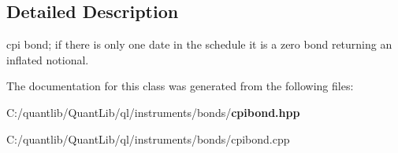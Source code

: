 \subsection{Detailed Description}
cpi bond; if there is only one date in the schedule it is a zero bond returning an inflated notional. 

The documentation for this class was generated from the following files\+:\begin{DoxyCompactItemize}
\item 
C\+:/quantlib/\+Quant\+Lib/ql/instruments/bonds/{\bf cpibond.\+hpp}\item 
C\+:/quantlib/\+Quant\+Lib/ql/instruments/bonds/cpibond.\+cpp\end{DoxyCompactItemize}
